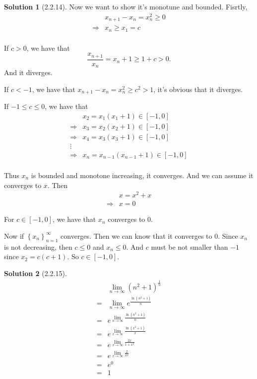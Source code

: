 \documentclass{article}
\theoremstyle{definition}
\newtheorem{sol}{Solution}[exe]
\begin{document}
\begin{sol}[2.2.14]

    Now we want to show it's monotune and bounded. Fisrtly, 
    \begin{align*}
        &x_{n+1}-x_{n}=x_{n}^{2}\geq 0\\
        \Rightarrow &x_{n} \geq x_{1}=c\\
    \end{align*} 

    If $c>0$, we have that $$\frac{x_{n+1}}{x_{n}}=x_{n}+1\geq 1+c >0.$$
    And it diverges.

    If $c<-1$, we have that $x_{n+1}-x_{n}=x_{n}^{2}\geq c^{2}>1$, it's obvious that it diverges.
    
    If $-1\leq c\leq 0$, we have that 
    \begin{align*}
    &x_{2}=x_{1}(x_{1}+1)\in[-1,0]\\
    \Rightarrow &x_{3}=x_{2}(x_{2}+1)\in[-1,0]\\
    \Rightarrow &x_{4}=x_{3}(x_{3}+1)\in[-1,0]\\
    \vdots\\
    \Rightarrow &x_{n}=x_{n-1}(x_{n-1}+1)\in[-1,0]\\
    \end{align*}

    Thus $x_{n}$ is bounded and monotone increasing, it converges. And we can assume it converges to $x$. Then
\begin{align*}
    &x=x^{2}+x\\
    \Rightarrow & x=0
\end{align*}
    
    For $c\in[-1,0]$, we have that $x_{n}$ converges to $0$.

Now if $\left\{x_{n}\right\}_{n=1}^{\infty}$ converges. Then we can know that it converges to $0$. Since $x_{n}$ is not decreasing, then $c\leq 0$ and $x_{n}\leq0$.
And $c$ must be not smaller than $-1$ since $x_{2}=c(c+1)$. So $c\in[-1,0]$.
\end{sol}

\begin{sol}[2.2.15]
    \begin{align*}
        & \lim_{n\to\infty}(n^2+1)^{\frac{1}{n}}\\
        =& \lim_{n\to\infty}e^{\frac{\ln(n^2+1)}{n}}\\
        =& e^{\lim_{n\to\infty}\frac{\ln(n^2+1)}{n}}\\
        =& e^{\lim_{x\to\infty}\frac{\ln(x^2+1)}{x}}\\
        =& e^{\lim_{x\to\infty}\frac{2x}{1+x^2}}\\
        =& e^{\lim_{x\to\infty}\frac{2}{2x}}\\
        =& e^{0}\\
        =& 1
    \end{align*}
\end{sol}
\end{document}
